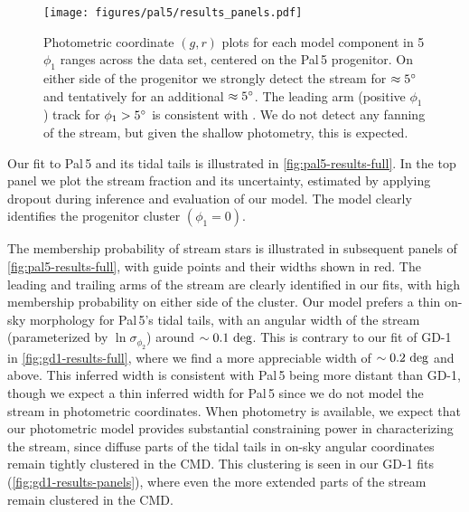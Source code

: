 \documentclass[twocolumn]{aastex631}
\newcommand{\stream}[1]{#1}
\begin{document}
        \begin{figure*}[htp]
            \centering
            \texttt{[image: figures/pal5/results\_panels.pdf]}
            \caption{%
                Photometric coordinate $(g, r)$ plots for each model component
                in 5 $\phi_1$ ranges across the data set, centered on the
                \stream{Pal\,5} progenitor.
                On either side of the progenitor we strongly detect the stream
                for $\approx 5\degree$ and tentatively for an additional
                $\approx 5\degree$. The leading arm (positive $\phi_1$) track
                for $\phi_1 > 5\degree$ is consistent with
                \citet{Starkman+2019}. We do not detect any fanning of the
                stream, but given the shallow photometry, this is expected.
            }
            \label{fig:pal5-results-panels}
        \end{figure*}

    
        Our fit to \stream{Pal\,5} and its tidal tails is illustrated in
        \autoref{fig:pal5-results-full}. In the top panel we plot the stream
        fraction and its uncertainty, estimated by applying dropout during
        inference and evaluation of our model. The model clearly identifies the
        progenitor cluster $(\phi_1 = 0)$. 
    
        The membership probability of stream stars is illustrated in subsequent
        panels of \autoref{fig:pal5-results-full}, with guide points and their
        widths shown in red. The leading and trailing arms of the stream are
        clearly identified in our fits, with high membership probability on
        either side of the cluster. Our model prefers a thin on-sky morphology
        for \stream{Pal\,5}'s tidal tails, with an angular width of the stream
        (parameterized by $\ln{\sigma_{\phi_2}}$) around $\sim 0.1~\rm{deg}$.
        This is contrary to our fit of \stream{GD-1} in
        \autoref{fig:gd1-results-full}, where we find a more appreciable width
        of $\sim 0.2~\rm{deg}$ and above.  This inferred width is consistent
        with \stream{Pal\,5} being more distant than \stream{GD-1}, though we
        expect a thin inferred width for \stream{Pal\,5} since we do not model
        the stream in photometric coordinates. When photometry is available, we
        expect that our photometric model provides substantial constraining
        power in characterizing the stream, since diffuse parts of the tidal
        tails in on-sky angular coordinates remain tightly clustered in the CMD.
        This clustering is seen in our \stream{GD-1} fits
        (\autoref{fig:gd1-results-panels}), where even the more extended parts
        of the stream remain clustered in the CMD.
        
\end{document}
